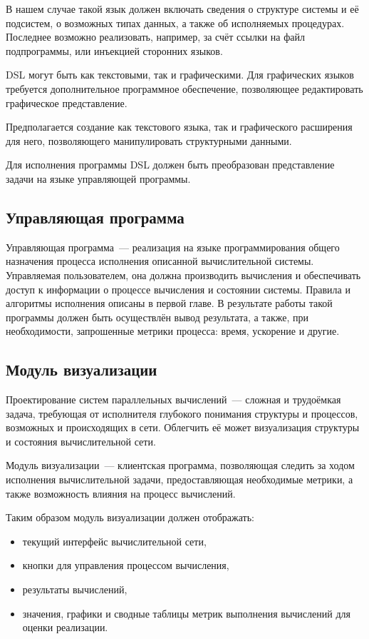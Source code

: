 В нашем случае такой язык должен включать сведения о структуре системы и её подсистем, о возможных типах данных, а также об исполняемых процедурах. 
Последнее возможно реализовать, например, за счёт ссылки на файл подпрограммы, или инъекцией сторонних языков.

DSL могут быть как текстовыми, так и графическими. 
Для графических языков требуется дополнительное программное обеспечение, позволяющее редактировать графическое представление.

Предполагается создание как текстового языка, так и графического расширения для него, позволяющего манипулировать структурными данными.

Для исполнения программы DSL должен быть преобразован представление задачи на языке управляющей программы.
\subsection{Управляющая программа}

Управляющая программа~--- реализация на языке программирования общего назначения процесса исполнения описанной вычислительной системы.
Управляемая пользователем, она должна производить вычисления и обеспечивать доступ к информации о процессе вычисления и состоянии системы.
Правила и алгоритмы исполнения описаны в первой главе.
В результате работы такой программы должен быть осуществлён вывод результата, а также, при необходимости, запрошенные метрики процесса: время, ускорение и другие.


\subsection{Модуль визуализации}
Проектирование систем параллельных вычислений~--- сложная и трудоёмкая задача, требующая от исполнителя глубокого понимания структуры и процессов, возможных и происходящих в сети. 
Облегчить её может визуализация структуры и состояния вычислительной сети.

Модуль визуализации~--- клиентская программа, позволяющая следить за ходом исполнения вычислительной задачи, предоставляющая необходимые метрики, а также возможность влияния на процесс вычислений.

Таким образом модуль визуализации должен отображать:
\begin{itemize}
	\item текущий интерфейс вычислительной сети,
	\item кнопки для управления процессом вычисления,
	\item результаты вычислений,
	\item значения, графики и сводные таблицы метрик выполнения вычислений для оценки реализации.
\end{itemize}


